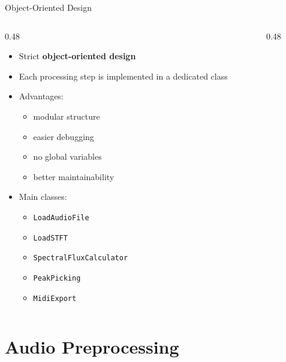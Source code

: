\documentclass[aspectratio=169]{beamer}
\begin{document}
\begin{frame}{Object-Oriented Design}
    \begin{columns}[T]
        \begin{column}{0.48\textwidth}
            \begin{itemize}
                \item Strict \textbf{object-oriented design}
                \item Each processing step is implemented in a dedicated class
                \item Advantages:
                \begin{itemize}
                    \item modular structure
                    \item easier debugging
                    \item no global variables
                    \item better maintainability
                \end{itemize}
                \item Main classes:
                \begin{itemize}
                    \item \texttt{LoadAudioFile}
                    \item \texttt{LoadSTFT}
                    \item \texttt{SpectralFluxCalculator}
                    \item \texttt{PeakPicking}
                    \item \texttt{MidiExport}
                \end{itemize}
            \end{itemize}
        \end{column}
        \begin{column}{0.48\textwidth}
        \end{column}
    \end{columns}
    
\end{frame}

\section{Audio Preprocessing}
\end{document}
